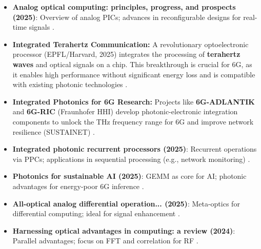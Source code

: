 	\begin{itemize}
		\item \textbf{Analog optical computing: principles, progress, and prospects (2025)}: Overview of analog PICs; advances in reconfigurable designs for real-time signals \cite{analog_optical}.
		\item \textbf{Integrated Terahertz Communication:} A revolutionary optoelectronic processor (EPFL/Harvard, 2025) integrates the processing of \textbf{terahertz waves} and optical signals on a chip. This breakthrough is crucial for 6G, as it enables high performance without significant energy loss and is compatible with existing photonic technologies \cite{thz_epfl}.
		\item \textbf{Integrated Photonics for 6G Research:} Projects like \textbf{6G-ADLANTIK} and \textbf{6G-RIC} (Fraunhofer HHI) develop photonic-electronic integration components to unlock the THz frequency range for 6G and improve network resilience (SUSTAINET) \cite{hhi_6g}.
		\item \textbf{Integrated photonic recurrent processors (2025)}: Recurrent operations via PPCs; applications in sequential processing (e.g., network monitoring) \cite{recurrent_photonics}.
		\item \textbf{Photonics for sustainable AI (2025)}: GEMM as core for AI; photonic advantages for energy-poor 6G inference \cite{photonics_ai}.
		\item \textbf{All-optical analog differential operation... (2025)}: Meta-optics for differential computing; ideal for signal enhancement \cite{differential_optical}.
		\item \textbf{Harnessing optical advantages in computing: a review (2024)}: Parallel advantages; focus on FFT and correlation for RF \cite{optical_advantages}.
	\end{itemize}
	
